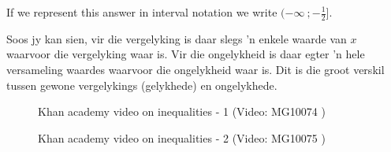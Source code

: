 If we represent this answer in interval notation we write $(-\infty ~;-\frac{1}{2}]$.\par
{}
Soos jy kan sien, vir die vergelyking is daar slegs ’n enkele waarde van  $x$ waarvoor die vergelyking waar is. Vir
die ongelykheid is daar egter ’n hele versameling waardes waarvoor die ongelykheid waar is. Dit is die groot
verskil tussen gewone vergelykings (gelykhede) en ongelykhede.\par 

\setcounter{subfigure}{0}
\begin{figure}[H] %
\textnormal{Khan academy video on inequalities - 1}\vspace{.1in} \nopagebreak
\label{m39254*yt-media4}\label{m39254*yt-video4}
 { (Video:  MG10074 )}
\vspace{2pt}
\vspace{.1in}
\end{figure}    

\setcounter{subfigure}{0}
\begin{figure}[H] %
\textnormal{Khan academy video on inequalities - 2}\vspace{.1in} \nopagebreak
\label{m39254*yt-media5}\label{m39254*yt-video5}
 { (Video:  MG10075 )}
\vspace{2pt}
\vspace{.1in}
\end{figure}  
  
